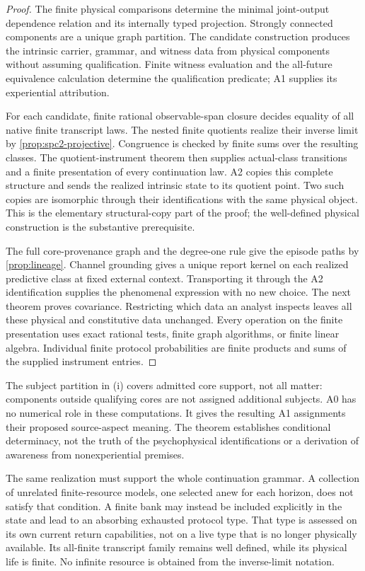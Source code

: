 \begin{proof}
The finite physical comparisons determine the minimal joint-output dependence relation and its internally typed projection. Strongly connected components are a unique graph partition. The candidate construction produces the intrinsic carrier, grammar, and witness data from physical components without assuming qualification. Finite witness evaluation and the all-future equivalence calculation determine the qualification predicate; A1 supplies its experiential attribution.

For each candidate, finite rational observable-span closure decides equality of all native finite transcript laws. The nested finite quotients realize their inverse limit by \cref{prop:spc2-projective}. Congruence is checked by finite sums over the resulting classes. The quotient-instrument theorem then supplies actual-class transitions and a finite presentation of every continuation law. A2 copies this complete structure and sends the realized intrinsic state to its quotient point. Two such copies are isomorphic through their identifications with the same physical object. This is the elementary structural-copy part of the proof; the well-defined physical construction is the substantive prerequisite.

The full core-provenance graph and the degree-one rule give the episode paths by \cref{prop:lineage}. Channel grounding gives a unique report kernel on each realized predictive class at fixed external context. Transporting it through the A2 identification supplies the phenomenal expression with no new choice. The next theorem proves covariance. Restricting which data an analyst inspects leaves all these physical and constitutive data unchanged. Every operation on the finite presentation uses exact rational tests, finite graph algorithms, or finite linear algebra. Individual finite protocol probabilities are finite products and sums of the supplied instrument entries.
\end{proof}

The subject partition in (i) covers admitted core support, not all matter: components outside qualifying cores are not assigned additional subjects. A0 has no numerical role in these computations. It gives the resulting A1 assignments their proposed source-aspect meaning. The theorem establishes conditional determinacy, not the truth of the psychophysical identifications or a derivation of awareness from nonexperiential premises.

The same realization must support the whole continuation grammar. A collection of unrelated finite-resource models, one selected anew for each horizon, does not satisfy that condition. A finite bank may instead be included explicitly in the state and lead to an absorbing exhausted protocol type. That type is assessed on its own current return capabilities, not on a live type that is no longer physically available. Its all-finite transcript family remains well defined, while its physical life is finite. No infinite resource is obtained from the inverse-limit notation.

